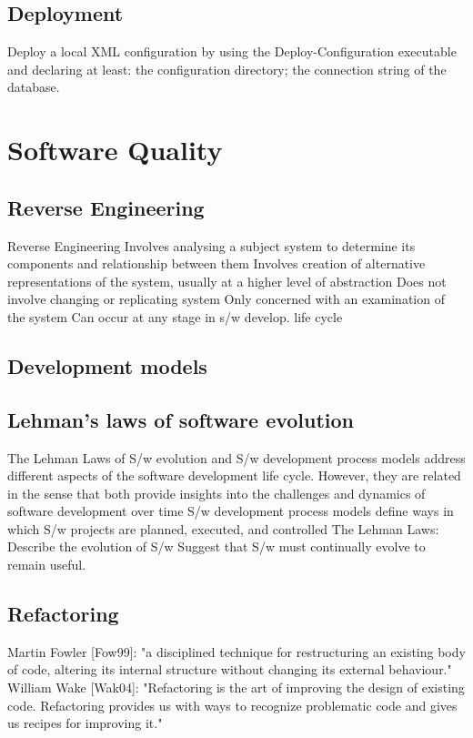 \subsection{Deployment}
\label{sec:Template}

Deploy a local XML configuration by using the Deploy-Configuration executable and declaring at least: the configuration directory; the connection string of the database.

\section{Software Quality}
\label{sec:Template}

\subsection{Reverse Engineering}
\label{sec:Development models}

Reverse Engineering Involves analysing a subject system to determine its components and relationship between them Involves creation of alternative representations of the system, usually at a higher level of abstraction Does not involve changing or replicating system Only concerned with an examination of the system Can occur at any stage in s/w develop. life cycle

\subsection{Development models}
\label{sec:Development models}

\subsection{Lehman’s laws of software evolution}
\label{sec:Lehman}

The Lehman Laws of S/w evolution and S/w development process models address different aspects of the software development life cycle. However, they are related in the sense that both provide insights into the challenges and dynamics of software development over time S/w development process models define ways in which S/w projects are planned, executed, and controlled The Lehman Laws: Describe the evolution of S/w Suggest that S/w must continually evolve to remain useful.

\subsection{Refactoring}
\label{sec:Refactoring}

\cite{fowler2018refactoring}
Martin Fowler [Fow99]: "a disciplined technique for restructuring an existing body of code, altering its internal structure without changing its external behaviour." William Wake [Wak04]: "Refactoring is the art of improving the design of existing code. Refactoring provides us with ways to recognize problematic code and gives us recipes for improving it."
